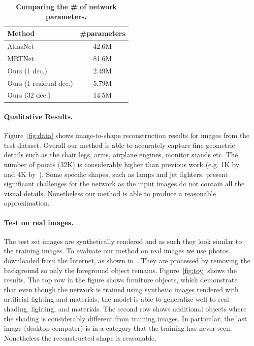 \begin{table}
\centering
{
\begin{tabular}{|l|c|}
    \hline
    Method &  \#parameters \\
    \hline
    AtlasNet & 42.6M \\
    MRTNet & 81.6M \\
    \hline 
    Ours (1 dec.) & 2.49M \\
    Ours (1 residual dec.) & 5.79M \\
    Ours (32 dec.) & 14.5M  \\
    \hline
\end{tabular}
}
\caption{\label{tab:param} \small
    \textbf{Comparing the \# of network parameters.}
}
\end{table}

\paragraph{Qualitative Results.} Figure~\ref{fig:data} shows image-to-shape reconstruction results for images from the test dataset. Overall our method is able to accurately capture fine geometric details such as the chair legs, arms, airplane engines, monitor stands etc. The number of points (32K) is considerably higher than previous work (e.g. 1K by~\cite{fan2016point} and 4K by~\cite{mrt18}). Some specific shapes, such as lamps and jet fighters, present significant challenges for the network as the input images do not contain all the visual details. Nonetheless our method is able to produce a reasonable approximation.


\paragraph{Test on real images.} The test set images are synthetically rendered and as such they look similar to the training images. To evaluate our method on real images we use photos downloaded from the Internet, as shown in~\cite{mrt18}. They are processed by removing the background so only the foreground object remains. Figure~\ref{fig:toy} shows the results. The top row in the figure shows furniture objects, which demonstrate that even though the network is trained using synthetic images rendered with artificial lighting and materials, the model is able to generalize well to real shading, lighting, and materials. The second row shows additional objects where the shading is considerably different from training images. In particular, the last image (desktop computer) is in a category that the training has never seen. Nonetheless the reconstructed shape is reasonable.



